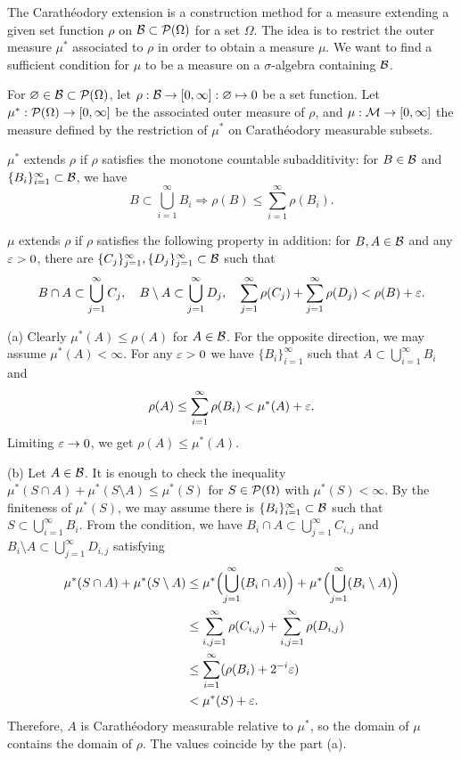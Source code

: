 \documentclass{../../large}
\begin{document}
\begin{prb}
The Carath\'eodory extension is a construction method for a measure extending a given set function $\rho$ on $\mathcal{B}\subset\mathcal{P}(\Omega)$ for a set $\Omega$.
The idea is to restrict the outer measure $\mu^*$ associated to $\rho$ in order to obtain a measure $\mu$.
We want to find a sufficient condition for $\mu$ to be a measure on a $\sigma$-algebra containing $\mathcal{B}$.

For $\varnothing\in\mathcal{B}\subset\mathcal{P}(\Omega)$, let $\rho:\mathcal{B}\to[0,\infty]:\varnothing\mapsto0$ be a set function.
Let $\mu^*:\mathcal{P}(\Omega)\to[0,\infty]$ be the associated outer measure of $\rho$, and $\mu:\mathcal{M}\to[0,\infty]$ the measure defined by the restriction of $\mu^*$ on Carath\'eodory measurable subsets.
\begin{parts}
\item $\mu^*$ extends $\rho$ if $\rho$ satisfies the monotone countable subadditivity: for $B\in\mathcal{B}$ and $\{B_i\}_{i=1}^\infty\subset\mathcal{B}$, we have
\[B\subset\bigcup_{i=1}^\infty B_i\Rightarrow\rho(B)\le\sum_{i=1}^\infty\rho(B_i).\]
\item $\mu$ extends $\rho$ if $\rho$ satisfies the following property in addition: for $B,A\in\mathcal{B}$ and any $\varepsilon>0$, there are $\{C_j\}_{j=1}^\infty,\{D_j\}_{j=1}^\infty\subset\mathcal{B}$ such that
\[B\cap A\subset\bigcup_{j=1}^\infty C_j,\quad B\setminus A\subset\bigcup_{j=1}^\infty D_j,\quad\sum_{j=1}^\infty\rho(C_j)+\sum_{j=1}^\infty\rho(D_j)<\rho(B)+\varepsilon.\]
\end{parts}
\end{prb}
\begin{pf}
(a)
Clearly $\mu^*(A)\le\rho(A)$ for $A\in\mathcal{B}$.
For the opposite direction, we may assume $\mu^*(A)<\infty$.
For any $\varepsilon>0$ we have $\{B_i\}_{i=1}^\infty$ such that $A\subset\bigcup_{i=1}^\infty B_i$ and
\[\rho(A)\le\sum_{i=1}^\infty\rho(B_i)<\mu^*(A)+\varepsilon.\]
Limiting $\varepsilon\to0$, we get $\rho(A)\le\mu^*(A)$.

(b)
Let $A\in\mathcal{B}$.
It is enough to check the inequality $\mu^*(S\cap A)+\mu^*(S\setminus A)\le\mu^*(S)$ for $S\in\mathcal{P}(\Omega)$ with $\mu^*(S)<\infty$.
By the finiteness of $\mu^*(S)$, we may assume there is $\{B_i\}_{i=1}^\infty\subset\mathcal{B}$ such that $S\subset\bigcup_{i=1}^\infty B_i$.
From the condition, we have $B_i\cap A\subset\bigcup_{j=1}^\infty C_{i,j}$ and $B_i\setminus A\subset\bigcup_{j=1}^\infty D_{i,j}$ satisfying
\begin{align*}
\mu^*(S\cap A)+\mu^*(S\setminus A)
&\le\mu^*\Bigl(\bigcup_{j=1}^\infty(B_i\cap A)\Bigr)+\mu^*\Bigl(\bigcup_{j=1}^\infty(B_i\setminus A)\Bigr)\\
&\le\sum_{i,j=1}^\infty\rho(C_{i,j})+\sum_{i,j=1}^\infty\rho(D_{i,j})\\
&\le\sum_{i=1}^\infty(\rho(B_i)+2^{-i}\varepsilon)\\
&<\mu^*(S)+\varepsilon.
\end{align*}
Therefore, $A$ is Carath\'eodory measurable relative to $\mu^*$, so the domain of $\mu$ contains the domain of $\rho$.
The values coincide by the part (a).
\end{pf}
\end{document}
